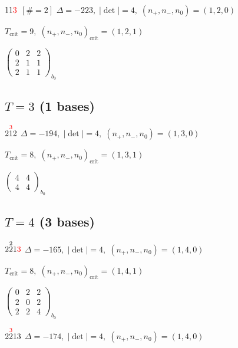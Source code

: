 \documentclass[10pt]{article}
\begin{document}
$11\textcolor{red}{3}$ $\scriptstyle [\#=2]$ \quad $\Delta=-223,\; |\det|=4,\; (n_+,n_-,n_0)=(1,2,0)$

\hspace{1em}$T_{\text{crit}}=9,\; (n_+,n_-,n_0)_{\text{crit}}=(1,2,1)$

\hspace{2em}$\left(\begin{smallmatrix}0 & 2 & 2 \\ 2 & 1 & 1 \\ 2 & 1 & 1\end{smallmatrix}\right)_{\!b_0}$


\subsection*{$T = 3$ \quad (1 bases)}
\smallskip

$2\overset{\textcolor{red}{3}}{1}2$ \quad $\Delta=-194,\; |\det|=4,\; (n_+,n_-,n_0)=(1,3,0)$

\hspace{1em}$T_{\text{crit}}=8,\; (n_+,n_-,n_0)_{\text{crit}}=(1,3,1)$

\hspace{2em}$\left(\begin{smallmatrix}4 & 4 \\ 4 & 4\end{smallmatrix}\right)_{\!b_0}$


\subsection*{$T = 4$ \quad (3 bases)}
\smallskip

$2\overset{2}{2}1\textcolor{red}{3}$ \quad $\Delta=-165,\; |\det|=4,\; (n_+,n_-,n_0)=(1,4,0)$

\hspace{1em}$T_{\text{crit}}=8,\; (n_+,n_-,n_0)_{\text{crit}}=(1,4,1)$

\hspace{2em}$\left(\begin{smallmatrix}0 & 2 & 2 \\ 2 & 0 & 2 \\ 2 & 2 & 4\end{smallmatrix}\right)_{\!b_0}$

\smallskip

$2\overset{\textcolor{red}{3}}{2}13$ \quad $\Delta=-174,\; |\det|=4,\; (n_+,n_-,n_0)=(1,4,0)$
\end{document}
